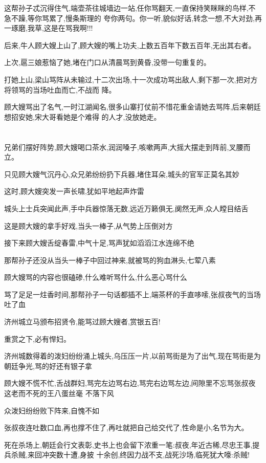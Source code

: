 ﻿\documentclass[12pt]{article}
\begin{document}
这帮孙子忒沉得住气,端壶茶往城墙边一站,任你骂翻天,一直保持笑眯眯的鸟样,不急不躁,等你骂累了,慢条斯理的
夸你两句。你一听,貌似好话,转念一想,不大对劲,再一琢磨,我草,这是在骂我啊!!!

后来,牛人顾大嫂上山了,顾大嫂的嘴上功夫,上数五百年下数五百年,无出其右者。

上次,扈三娘惹恼了她,堵在门口从清晨骂到黄昏,没带一句重复的。

打她上山,梁山骂阵从未输过,十二次出场,十一次成功骂出敌人,剩下那一次,把对方将领骂的当场吐血而亡,不战而
降。

顾大嫂骂出了名气,一时江湖闻名,很多山寨打仗前不惜花重金请她去骂阵,后来朝廷想招安她,宋大哥看她是个难得
的人才,没放她走。
\section{}

兄弟们摆好阵势,顾大嫂喝口茶水,润润嗓子,咳嗽两声,大摇大摆走到阵前,叉腰而立。

只见顾大嫂气沉丹心,众兄弟纷纷扔下兵器,堵住耳朵,城头的官军正莫名其妙

这时,顾大嫂突发一声长啸,犹如平地起声炸雷\dldots

城头上士兵突闻此声,手中兵器惊落无数,远近万籁俱无,阒然无声,众人瞠目结舌\dldots

这是顾大嫂的拿手好戏,当头一棒子,从气势上压倒对方

接下来顾大嫂舌绽春雷,中气十足,骂声犹如滔滔江水连绵不绝\dldots

那帮孙子还没从当头一棒子中回过神来,就被骂的狗血淋头,七荤八素\dldots

顾大嫂骂的内容也很磕碜,什么难听骂什么,什么恶心骂什么\dldots

骂了足足一炷香时间,那帮孙子一句话都插不上,端茶杯的手直哆嗦,张叔夜气的当场吐了血\dldots

济州城立马颁布招贤令,能骂过顾大嫂者,赏银五百!

重赏之下,必有悍妇。

济州城数得着的泼妇纷纷涌上城头,乌压压一片,以前骂街是为了出气,现在骂街是为朝廷争光,骂的好还有银子拿
\dldots

顾大嫂不慌不忙,舌战群妇,骂完左边骂右边,骂完右边骂左边,间隙里不忘骂张叔夜这老而不死的王八蛋\dldots 丝毫
不落下风

众泼妇纷纷败下阵来,自愧不如\dldots

张叔夜连吐数口血,再也撑不住了,再吐就把自己给交代了,性命是小,名节为大。

死在杀场上,朝廷会行文表彰,史书上也会留下浓重一笔:叔夜,年近古稀,尽忠王事,提兵杀贼,来回冲突数十遭,身披
十余创,终因力战不支,战死沙场,临死犹大嚎:杀贼!
\end{document}
